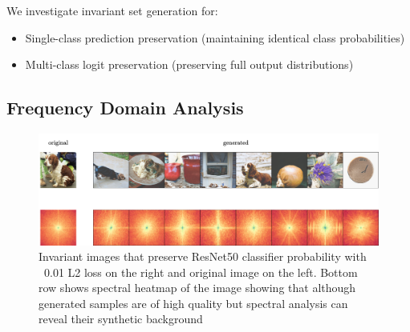 \documentclass[licencjacka,en]{pracamgr}
\begin{document}
We investigate invariant set generation for:
\begin{itemize}
\item Single-class prediction preservation (maintaining identical class probabilities)
\item Multi-class logit preservation (preserving full output distributions)  
\end{itemize}

\subsection{Frequency Domain Analysis}

\begin{figure}[h]
\centering
\includegraphics[width=\linewidth]{figures/main/spectral_analysis_1.png}
\caption{Invariant images that preserve ResNet50 classifier probability with ~0.01 L2 loss on the right and original image on the left. Bottom row shows spectral heatmap of the image showing that although generated samples are of high quality but spectral analysis can reveal their synthetic background}
\label{fig:frequency_analysis_1}
\end{figure}
\end{document}
